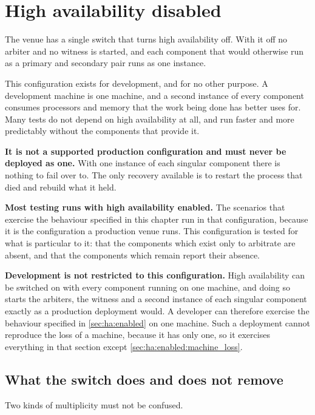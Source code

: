 \section{High availability disabled}
\label{sec:ha:disabled}

The venue has a single switch that turns high availability off. With it off no
arbiter and no witness is started, and each component that would otherwise run
as a primary and secondary pair runs as one instance.

This configuration exists for development, and for no other purpose. A
development machine is one machine, and a second instance of every component
consumes processors and memory that the work being done has better uses for.
Many tests do not depend on high availability at all, and run faster and more
predictably without the components that provide it.

\textbf{It is not a supported production configuration and must never be
deployed as one.} With one instance of each singular component there is nothing
to fail over to. The only recovery available is to restart the process that died
and rebuild what it held.

\textbf{Most testing runs with high availability enabled.} The scenarios that
exercise the behaviour specified in this chapter run in that configuration,
because it is the configuration a production venue runs. This configuration is
tested for what is particular to it: that the components which exist only to
arbitrate are absent, and that the components which remain report their absence.

\textbf{Development is not restricted to this configuration.} High availability
can be switched on with every component running on one machine, and doing so
starts the arbiters, the witness and a second instance of each singular
component exactly as a production deployment would. A developer can therefore exercise the behaviour specified in
\cref{sec:ha:enabled} on one machine. Such a deployment cannot reproduce the loss
of a machine, because it has only one, so it exercises everything in that section
except \cref{sec:ha:enabled:machine_loss}.

\subsection{What the switch does and does not remove}
\label{sec:ha:disabled:scope}

Two kinds of multiplicity must not be confused.

